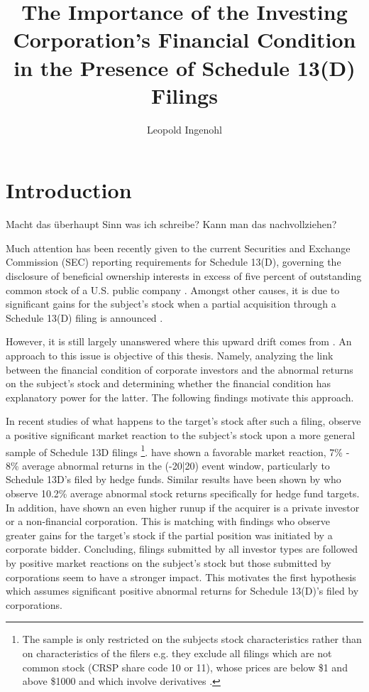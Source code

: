 \documentclass[12pt]{article}
\title{The Importance of the Investing Corporation's Financial Condition in the Presence of Schedule 13(D) Filings}
\author{Leopold Ingenohl}
\begin{document}
\maketitle

\pagebreak


\section{Introduction}

\begin{center}
	Macht das überhaupt Sinn was ich schreibe? Kann man das nachvollziehen? 
\end{center}
Much attention has been recently given to the current Securities and Exchange Commission (SEC) reporting requirements for Schedule 13(D), governing the disclosure of beneficial ownership interests in excess of five percent of outstanding common stock of a U.S. public company \citep{Giglia2018}. Amongst other causes, it is due to significant gains for the subject's stock when a partial acquisition through a Schedule 13(D) filing is announced \citep{Akhigbe2007}. 

However, it is still largely unanswered where this upward drift comes from \citep{Greenwood2009}. An approach to this issue is objective of this thesis. Namely, analyzing the link between the financial condition of corporate investors and the abnormal returns on the subject's stock and determining whether the financial condition has explanatory power for the latter. The following findings motivate this approach.  


In recent studies of what happens to the target's stock after such a filing, \citet{Collin-Dufresne2015} observe a positive significant market reaction to the subject's stock upon a more general sample of Schedule 13D filings 
	\footnote{The sample is only restricted on the subjects stock characteristics rather than on characteristics of the filers e.g. they exclude all filings which are not common stock (CRSP share code 10 or 11), whose prices are below \$1 and above \$1000 and which involve derivatives \citep{Collin-Dufresne2015}.}. 
\citet{Brav2008} have shown a favorable market reaction, 7\% - 8\% average abnormal returns in the (-20|20) event window, particularly to Schedule 13D's filed by hedge funds. Similar results have been shown by \citet{Klein2009} who observe 10.2\% average abnormal stock returns specifically for hedge fund targets.\\
In addition, \citet{Brigida2012} have shown an even higher runup if the acquirer is a private investor or a non-financial corporation. This is matching with \citet{Akhigbe2007} findings who observe greater gains for the target's stock if the partial position was initiated by a corporate bidder. Concluding, filings submitted by all investor types are followed by positive market reactions on the subject's stock but those submitted by corporations seem to have a stronger impact. This motivates the first hypothesis which assumes significant positive abnormal returns for Schedule 13(D)'s filed by corporations.
\end{document}
